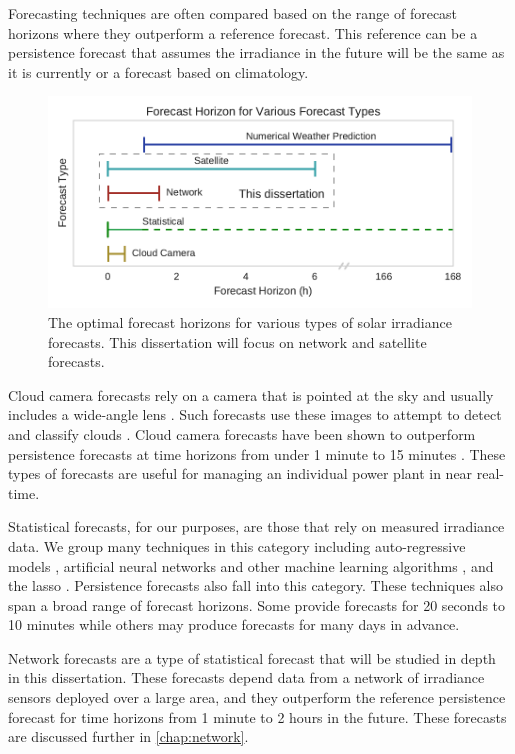 Forecasting techniques are often compared based on the range of
forecast horizons where they outperform a reference forecast.
This reference can be a persistence forecast that assumes the
irradiance in the future will be the same as it is currently or a
forecast based on climatology.

\begin{figure}[tbh]
\includegraphics[width=\textwidth]{figs/fxhoriz.pdf}
\caption[Forecast horizon for various forecast types]{
The optimal forecast horizons for various types of solar irradiance
forecasts. This dissertation will focus on network and satellite
forecasts.}
\label{fig:fxhoriz}
\end{figure}

Cloud camera forecasts rely on a camera that is pointed at the sky and
usually includes a wide-angle lens \citep{Urquhart2013}.
Such forecasts use these images to attempt to detect and classify
clouds \citep{Ghonima2012}.
Cloud camera forecasts have been shown to outperform persistence
forecasts at time horizons from under 1 minute to 15 minutes
\citep{Yang2014a}.
These types of forecasts are useful for managing an individual power
plant in near real-time.

Statistical forecasts, for our purposes, are those that rely on
measured irradiance data.
We group many techniques in this category including auto-regressive
models \citep{Yang2014}, artificial neural networks
\citep{Gutierrez-Corea2016} and other machine learning algorithms
\citep{Pedro2012,Mellit2008}, and the lasso \citep{Yang2015a}.
Persistence forecasts also fall into this category.
These techniques also span a broad range of forecast horizons.
Some provide forecasts for 20 seconds to 10 minutes while others may
produce forecasts for many days in advance.

Network forecasts are a type of statistical forecast that will be
studied in depth in this dissertation.
These forecasts depend data from a network of irradiance sensors
deployed over a large area, and they outperform the reference
persistence forecast for time horizons from 1 minute to 2 hours in the
future.
These forecasts are discussed further in \cref{chap:network}.

